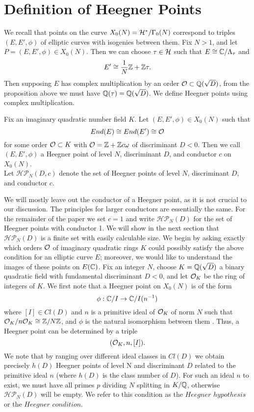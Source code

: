 \section{Definition of Heegner Points}
We recall that points on the curve $X_0(N) = \mathcal{H}^*/\Gamma_0(N)$ correspond to triples $(E,E',\phi)$ of elliptic curves with isogenies between them. Fix $N > 1$, and let $P = (E,E',\phi) \in X_0(N)$. Then we can choose $\tau \in \mathcal{H}$ such that $E \cong \mathbb{C}/\Lambda_\tau$ and 
$$E' \cong \frac{1}{N}\mathbb{Z} + \mathbb{Z}\tau.$$
Then supposing $E$ has complex multiplication by an order $\mathcal{O} \subset \mathbb{Q}(\sqrt{D})$, from the proposition above we must have $\mathbb{Q}(\tau) = \mathbb{Q}(\sqrt{D})$. We define Heegner points using complex multiplication.
\begin{definition}\label{heegner point}
Fix an imaginary quadratic number field $K$. Let $(E,E',\phi) \in X_0(N)$ such that
$$End(E) \cong End(E') \cong \mathcal{O}$$
for some order $\mathcal{O} \subset K$ with 
$\mathcal{O} = \mathbb{Z} + \mathbb{Z}{c\omega}$ of discriminant $D < 0$. Then we call $(E,E',\phi)$ a Heegner point of level $N$, discriminant $D$, and conductor $c$ on $X_0(N)$. 
\\
Let $\mathcal{HP}_N(D,c)$ denote the set of Heegner points of level $N$, discriminant $D$, and conductor $c$.
\end{definition}
We will mostly leave out the conductor of a Heegner point, as it is not crucial to our discussion. The principles for larger conductors are essentially the same. For the remainder of the paper we set $c=1$ and write $\mathcal{HP}_N(D)$ for the set of Heegner points with conductor 1.
We will show in the next section that $\mathcal{HP}_N(D)$ is a finite set with easily calculable size. We begin by asking exactly which orders $\mathcal{O}$ of imaginary quadratic rings $K$ could possibly satisfy the above condition for an elliptic curve $E$; moreover, we would like to understand the images of these points on $E(\mathbb{C})$. Fix an integer $N$, choose $K = \mathbb{Q}(\sqrt{D})$ a binary quadratic field with fundamental discriminant $D < 0$, and let $\mathcal{O}_K$ be the ring of integers of $K$. We first note that a Heegner point on $X_0(N)$ is of the form
$$\phi:\mathbb{C}/I \to \mathbb{C}/I(n^{-1})$$
where $[I] \in Cl(D)$ and $n$ is a primitive ideal of $\mathcal{O}_K$ of norm $N$ such that $\mathcal{O}_K/n\mathcal{O}_K \cong \mathbb{Z}/N\mathbb{Z}$, and $\phi$ is the natural isomorphism between them \cite{Birch}. Thus, a Heegner point can be determined by a triple
$$(\mathcal{O}_K,n,[I]).$$
We note that by ranging over different ideal classes in $Cl(D)$ we obtain precisely $h(D)$ Heegner points of level N and discriminant $D$ related to the primitive ideal $n$ (where $h(D)$ is the class number of $D$). For such an ideal $n$ to exist, we must have all primes $p$ dividing $N$ splitting in $K/\mathbb{Q}$, otherwise $\mathcal{HP}_N(D)$ will be empty. We refer to this condition as the $Heegner$ $hypothesis$ or the $Heegner$ $condition$.

